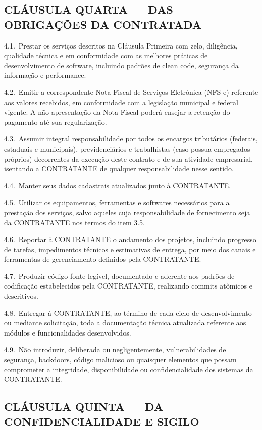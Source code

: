 \documentclass[11pt, a4paper]{article}
\begin{document}
\subsection{CLÁUSULA QUARTA — DAS OBRIGAÇÕES DA CONTRATADA}

4.1.\ Prestar os serviços descritos na Cláusula Primeira com zelo, diligência, qualidade técnica e em conformidade com as melhores práticas de desenvolvimento de software, incluindo padrões de clean code, segurança da informação e performance.

4.2.\ Emitir a correspondente Nota Fiscal de Serviços Eletrônica (NFS-e) referente aos valores recebidos, em conformidade com a legislação municipal e federal vigente. A não apresentação da Nota Fiscal poderá ensejar a retenção do pagamento até sua regularização.

4.3.\ Assumir integral responsabilidade por todos os encargos tributários (federais, estaduais e municipais), previdenciários e trabalhistas (caso possua empregados próprios) decorrentes da execução deste contrato e de sua atividade empresarial, isentando a CONTRATANTE de qualquer responsabilidade nesse sentido.

4.4.\ Manter seus dados cadastrais atualizados junto à CONTRATANTE.

4.5.\ Utilizar os equipamentos, ferramentas e softwares necessários para a prestação dos serviços, salvo aqueles cuja responsabilidade de fornecimento seja da CONTRATANTE nos termos do item 3.5.

4.6.\ Reportar à CONTRATANTE o andamento dos projetos, incluindo progresso de tarefas, impedimentos técnicos e estimativas de entrega, por meio dos canais e ferramentas de gerenciamento definidos pela CONTRATANTE.

4.7.\ Produzir código-fonte legível, documentado e aderente aos padrões de codificação estabelecidos pela CONTRATANTE, realizando commits atômicos e descritivos.

4.8.\ Entregar à CONTRATANTE, ao término de cada ciclo de desenvolvimento ou mediante solicitação, toda a documentação técnica atualizada referente aos módulos e funcionalidades desenvolvidos.

4.9.\ Não introduzir, deliberada ou negligentemente, vulnerabilidades de segurança, backdoors, código malicioso ou quaisquer elementos que possam comprometer a integridade, disponibilidade ou confidencialidade dos sistemas da CONTRATANTE.

\subsection{CLÁUSULA QUINTA — DA CONFIDENCIALIDADE E SIGILO}
\end{document}
